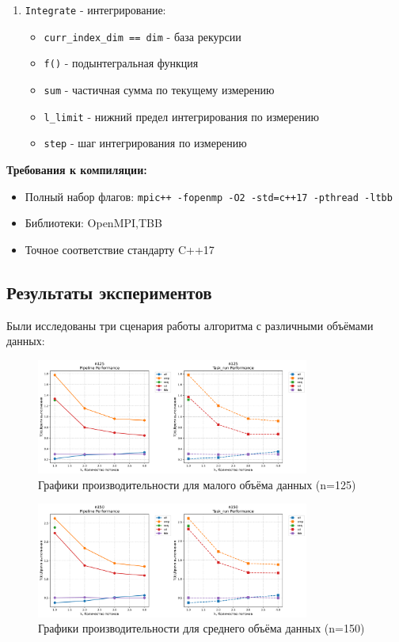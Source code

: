\documentclass[14pt,a4paper]{article}
\begin{document}
\begin{enumerate}
\item \texttt{Integrate} - интегрирование:
  \begin{itemize}
  \item \texttt{curr\_index\_dim == dim} - база рекурсии
  \item \texttt{f()} - подынтегральная функция
  \item \texttt{sum} - частичная сумма по текущему измерению
  \item \texttt{l\_limit} - нижний предел интегрирования по измерению
  \item \texttt{step} - шаг интегрирования по измерению
  \end{itemize}
\end{enumerate}

\textbf{Требования к компиляции:}
\begin{itemize}
\item Полный набор флагов: \texttt{mpic++ -fopenmp -O2 -std=c++17 -pthread -ltbb}
\item Библиотеки: OpenMPI,TBB
\item Точное соответствие стандарту C++17
\end{itemize}

\subsection{Результаты экспериментов}
Были исследованы три сценария работы алгоритма с различными объёмами данных:

\begin{figure}[H]
\centering
\includegraphics[width=0.8\textwidth]{ppc_tests/graphics/performance_n125.png}
\caption{Графики производительности для малого объёма данных (n=125)}
\label{fig:small}
\end{figure}

\begin{figure}[H]
\centering
\includegraphics[width=0.8\textwidth]{ppc_tests/graphics/performance_n150.png}
\caption{Графики производительности для среднего объёма данных (n=150)}
\label{fig:medium}
\end{figure}
\end{document}
